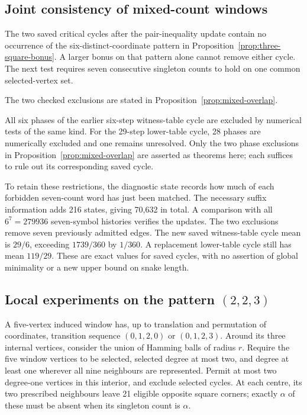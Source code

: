 \documentclass[11pt,a4paper]{article}
\theoremstyle{definition}
\theoremstyle{remark}
\begin{document}
\subsection{Joint consistency of mixed-count windows}
The two saved critical cycles after the pair-inequality update contain no occurrence of the six-distinct-coordinate pattern in Proposition~\ref{prop:three-square-bonus}. A larger bonus on that pattern alone cannot remove either cycle. The next test requires seven consecutive singleton counts to hold on one common selected-vertex set.

The two checked exclusions are stated in Proposition~\ref{prop:mixed-overlap}.

All six phases of the earlier six-step witness-table cycle are excluded by numerical tests of the same kind. For the 29-step lower-table cycle, 28 phases are numerically excluded and one remains unresolved. Only the two phase exclusions in Proposition~\ref{prop:mixed-overlap} are asserted as theorems here; each suffices to rule out its corresponding saved cycle.

To retain these restrictions, the diagnostic state records how much of each forbidden seven-count word has just been matched. The necessary suffix information adds 216 states, giving 70,632 in total. A comparison with all $6^7=279936$ seven-symbol histories verifies the updates. The two exclusions remove seven previously admitted edges. The new saved witness-table cycle mean is $29/6$, exceeding $1739/360$ by $1/360$. A replacement lower-table cycle still has mean $119/29$. These are exact values for saved cycles, with no assertion of global minimality or a new upper bound on snake length.

\subsection{Local experiments on the pattern $(2,2,3)$}
A five-vertex induced window has, up to translation and permutation of coordinates, transition sequence $(0,1,2,0)$ or $(0,1,2,3)$. Around its three internal vertices, consider the union of Hamming balls of radius $r$. Require the five window vertices to be selected, selected degree at most two, and degree at least one wherever all nine neighbours are represented. Permit at most two degree-one vertices in this interior, and exclude selected cycles. At each centre, its two prescribed neighbours leave 21 eligible opposite square corners; exactly $\alpha$ of these must be absent when its singleton count is $\alpha$.
\end{document}
